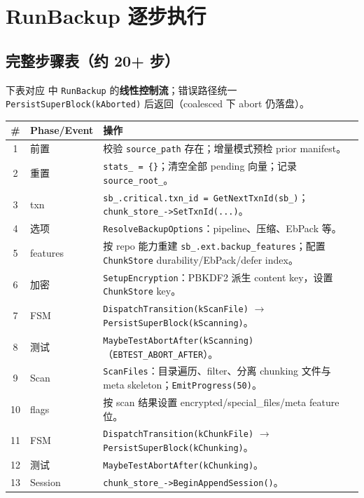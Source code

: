 \section{RunBackup 逐步执行}
\label{sec:be-runbackup}

\subsection{完整步骤表（约 20+ 步）}

下表对应  中 \texttt{RunBackup} 的\textbf{线性控制流}；错误路径统一 \texttt{PersistSuperBlock(kAborted)} 后返回（coalesced 下 abort 仍落盘）。

\begin{longtable}{@{}cp{2.8cm}p{9.2cm}@{}}
\toprule
\textbf{\#} & \textbf{Phase/Event} & \textbf{操作} \\
\midrule
\endhead
1 & 前置 & 校验 \texttt{source\_path} 存在；增量模式预检 prior manifest。 \\
2 & 重置 & \texttt{stats\_ = \{\}}；清空全部 pending 向量；记录 \texttt{source\_root\_}。 \\
3 & txn & \texttt{sb\_.critical.txn\_id = GetNextTxnId(sb\_)}；\texttt{chunk\_store\_->SetTxnId(...)}。 \\
4 & 选项 & \texttt{ResolveBackupOptions}：pipeline、压缩、EbPack 等。 \\
5 & features & 按 repo 能力重建 \texttt{sb\_.ext.backup\_features}；配置 \texttt{ChunkStore} durability/EbPack/defer index。 \\
6 & 加密 & \texttt{SetupEncryption}：PBKDF2 派生 content key，设置 \texttt{ChunkStore} key。 \\
7 & FSM & \texttt{DispatchTransition(kScanFile)} $\rightarrow$ \texttt{PersistSuperBlock(kScanning)}。 \\
8 & 测试 & \texttt{MaybeTestAbortAfter(kScanning)}（\texttt{EBTEST\_ABORT\_AFTER}）。 \\
9 & Scan & \texttt{ScanFiles}：目录遍历、filter、分离 chunking 文件与 meta skeleton；\texttt{EmitProgress(50)}。 \\
10 & flags & 按 scan 结果设置 encrypted/special\_files/meta feature 位。 \\
11 & FSM & \texttt{DispatchTransition(kChunkFile)} $\rightarrow$ \texttt{PersistSuperBlock(kChunking)}。 \\
12 & 测试 & \texttt{MaybeTestAbortAfter(kChunking)}。 \\
13 & Session & \texttt{chunk\_store\_->BeginAppendSession()}。 \\

\end{longtable}

